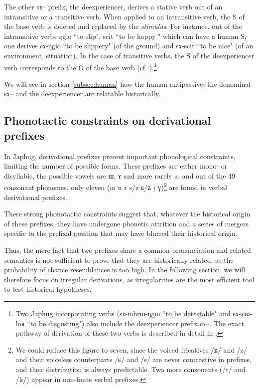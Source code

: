 \documentclass[oldfontcommands,oneside,a4paper,11pt]{article}
\newcommand{\ipa}[1]{{\phon \mbox{#1}}} %
\begin{document}
The other \ipa{sɤ}-- prefix, the deexperiencer, derives a stative verb out of an intransitive or a transitive verb. When applied to an intransitive verb, the S of the base verb is deleted and replaced by the \textit{stimulus}. For instance, out of the intransitive verbs \ipa{ŋgio} ``to slip", \ipa{scit}  ``to be happy	" which can have a human S, one derives \ipa{sɤ-ŋgio} ``to be slippery" (of the ground) and \ipa{sɤ-scit} ``to be nice" (of an environment, situation).  In the case of transitive verbs, the S of the deexperiencer verb corresponds to the O of the base verb (cf. \citealt{jacques12demotion}).\footnote{Two Japhug incorporating verbs (\ipa{sɤ-mbrɯ-ŋgɯ} ``to be detestable" and \ipa{sɤ-ʑɯ-loʁ} ``to be disgusting") also include the deexperiencer prefix \ipa{sɤ}--. The exact pathway of derivation of these two verbs is described in detail in  \citet[§4.1]{jacques12incorp}.}
  
  We will see in section \ref{subsec:human} how the human antipassive, the denominal \ipa{sɤ}-- and the deexperiencer are relatable historically.
 


\subsection{Phonotactic constraints on derivational prefixes}
In Japhug, derivational prefixes present important phonological constraints, limiting the number of possible forms. These prefixes are either mono- or disyllabic, the possible vowels are  \ipa{ɯ}, \ipa{ɤ} and more rarely \ipa{a}, and out of the 49 consonant phonemes, only eleven (m n r s/z ɕ/ʑ j ɣ)\footnote{We could reduce this figure to seven, since the voiced fricatives /ʑ/ and /z/ and their voiceless counterparts /ɕ/ and /s/ are never contrastive in prefixes, and their distribution is always predictable. Two more consonants (/t/ and /k/) appear in non-finite verbal prefixes.} are found in verbal derivational prefixes. 

These strong phonotactic constraints suggest that, whatever the historical origin of these prefixes, they have undergone phonetic attrition and a series of mergers specific to the prefixal position  that may have blurred their historical origin.

Thus, the mere fact that two prefixes share a common pronunciation and related semantics is not sufficient to prove that they are historically related, as the probability of chance resemblances is too high. In the following section, we will therefore focus on irregular derivations, as irregularities are the most efficient tool to test historical hypotheses.
\end{document}
